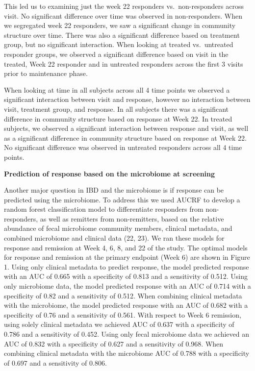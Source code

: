 \documentclass[11pt,]{article}
\begin{document}
This led us to examining just the week 22 responders vs.~non-responders
across visit. No significant difference over time was observed in
non-responders. When we segregated week 22 responders, we saw a
significant change in community structure over time. There was also a
significant difference based on treatment group, but no significant
interaction. When looking at treated vs.~untreated responder groups, we
observed a significant difference based on visit in the treated, Week 22
responder and in untreated responders across the first 3 visits prior to
maintenance phase.

When looking at time in all subjects across all 4 time points we
observed a significant interaction between visit and response, however
no interaction between visit, treatment group, and response. In all
subjects there was a significant difference in community structure based
on response at Week 22. In treated subjects, we observed a significant
interaction between response and visit, as well as a significant
difference in community structure based on response at Week 22. No
significant difference was observed in untreated responders across all 4
time points.

\textbf{Prediction of response based on the microbiome at screening}

Another major question in IBD and the microbiome is if response can be
predicted using the microbiome. To address this we used AUCRF to develop
a random forest classification model to differentiate responders from
non-responders, as well as remitters from non-remitters, based on the
relative abundance of fecal microbiome community members, clinical
metadata, and combined microbiome and clinical data (22, 23). We ran
these models for response and remission at Week 4, 6, 8, and 22 of the
study. The optimal models for response and remission at the primary
endpoint (Week 6) are shown in Figure 1. Using only clinical metadata to
predict response, the model predicted response with an AUC of 0.665 with
a specificity of 0.813 and a sensitivity of 0.512. Using only microbiome
data, the model predicted response with an AUC of 0.714 with a
specificity of 0.82 and a sensitivity of 0.512. When combining clinical
metadata with the microbiome, the model predicted response with an AUC
of 0.682 with a specificity of 0.76 and a sensitivity of 0.561. With
respect to Week 6 remission, using solely clinical metadata we achieved
AUC of 0.637 with a specificity of 0.786 and a sensitivity of 0.452.
Using only fecal microbiome data we achieved an AUC of 0.832 with a
specificity of 0.627 and a sensitivity of 0.968. When combining clinical
metadata with the microbiome AUC of 0.788 with a specificity of 0.697
and a sensitivity of 0.806.
\end{document}
